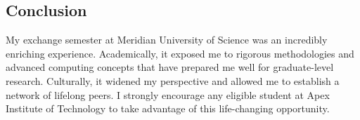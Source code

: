 \subsection{Conclusion}
My exchange semester at Meridian University of Science was an incredibly enriching experience. Academically, it exposed me to rigorous methodologies and advanced computing concepts that have prepared me well for graduate-level research. Culturally, it widened my perspective and allowed me to establish a network of lifelong peers. I strongly encourage any eligible student at Apex Institute of Technology to take advantage of this life-changing opportunity.
